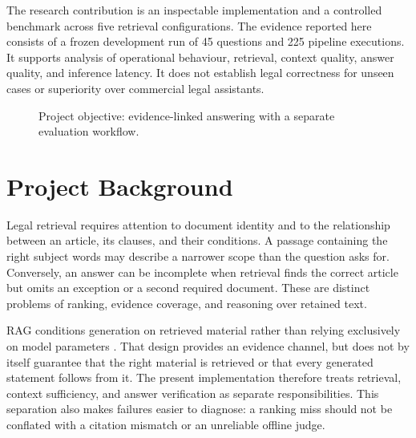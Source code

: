 The research contribution is an inspectable implementation and a controlled benchmark across five retrieval configurations. The evidence reported here consists of a frozen development run of 45 questions and 225 pipeline executions. It supports analysis of operational behaviour, retrieval, context quality, answer quality, and inference latency. It does not establish legal correctness for unseen cases or superiority over commercial legal assistants.

\begin{figure}[H]\centering
{}
\caption{Project objective: evidence-linked answering with a separate evaluation workflow.}\label{fig:objective}
\end{figure}

\section{Project Background}
Legal retrieval requires attention to document identity and to the relationship between an article, its clauses, and their conditions. A passage containing the right subject words may describe a narrower scope than the question asks for. Conversely, an answer can be incomplete when retrieval finds the correct article but omits an exception or a second required document. These are distinct problems of ranking, evidence coverage, and reasoning over retained text.

RAG conditions generation on retrieved material rather than relying exclusively on model parameters \citep{lewis2020rag}. That design provides an evidence channel, but does not by itself guarantee that the right material is retrieved or that every generated statement follows from it. The present implementation therefore treats retrieval, context sufficiency, and answer verification as separate responsibilities. This separation also makes failures easier to diagnose: a ranking miss should not be conflated with a citation mismatch or an unreliable offline judge.


